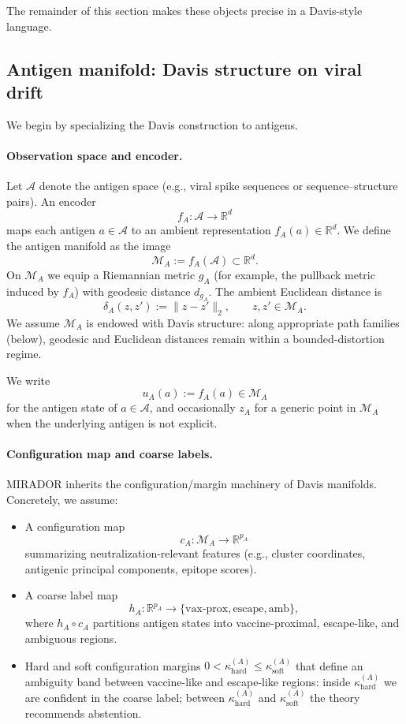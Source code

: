 \documentclass[11pt]{article}
\newcommand{\M}{\mathcal{M}}
\newcommand{\Acal}{\mathcal{A}}
\begin{document}
The remainder of this section makes these objects precise in a Davis-style language.

\subsection{Antigen manifold: Davis structure on viral drift}
\label{sec:antigen-manifold}

We begin by specializing the Davis construction to antigens.

\paragraph{Observation space and encoder.}
Let $\Acal$ denote the antigen space (e.g., viral spike sequences or sequence--structure pairs). An encoder
\[
  f_A : \Acal \to \mathbb{R}^d
\]
maps each antigen $a \in \Acal$ to an ambient representation $f_A(a) \in \mathbb{R}^d$. We define the antigen manifold as the image
\[
  \M_A := f_A(\Acal) \subset \mathbb{R}^d.
\]
On $\M_A$ we equip a Riemannian metric $g_A$ (for example, the pullback metric induced by $f_A$) with geodesic distance $d_{g_A}$. The ambient Euclidean distance is
\[
  \delta_A(z, z') := \bigl\| z - z' \bigr\|_2, \qquad z, z' \in \M_A.
\]
We assume $\M_A$ is endowed with Davis structure: along appropriate path families (below), geodesic and Euclidean distances remain within a bounded-distortion regime.

We write
\[
  u_A(a) := f_A(a) \in \M_A
\]
for the antigen state of $a \in \Acal$, and occasionally $z_A$ for a generic point in $\M_A$ when the underlying antigen is not explicit.

\paragraph{Configuration map and coarse labels.}
MIRADOR inherits the configuration/margin machinery of Davis manifolds. Concretely, we assume:

\begin{itemize}
  \item A configuration map
  \[
    c_A : \M_A \to \mathbb{R}^{p_A}
  \]
  summarizing neutralization-relevant features (e.g., cluster coordinates, antigenic principal components, epitope scores).

  \item A coarse label map
  \[
    h_A : \mathbb{R}^{p_A} \to \{\text{vax-prox},\text{escape},\text{amb}\},
  \]
  where $h_A \circ c_A$ partitions antigen states into vaccine-proximal, escape-like, and ambiguous regions.

  \item Hard and soft configuration margins $0 < \kappa^{(A)}_{\mathrm{hard}} \le \kappa^{(A)}_{\mathrm{soft}}$ that define an ambiguity band between vaccine-like and escape-like regions: inside $\kappa^{(A)}_{\mathrm{hard}}$ we are confident in the coarse label; between $\kappa^{(A)}_{\mathrm{hard}}$ and $\kappa^{(A)}_{\mathrm{soft}}$ the theory recommends abstention.
\end{itemize}
\end{document}

